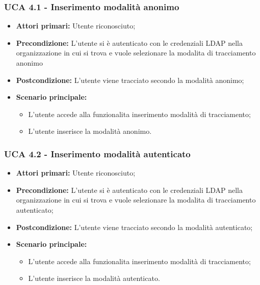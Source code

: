 \subsubsection{UCA 4.1 - Inserimento modalità anonimo}%
\begin{itemize}
\item \textbf{Attori primari:} Utente riconosciuto;
\item \textbf{Precondizione:} L'utente si è autenticato con le credenziali LDAP nella organizzazione in cui si trova e vuole selezionare la modalita di tracciamento anonimo
\item \textbf{Postcondizione:}  L'utente viene tracciato secondo la modalità anonimo;
\item \textbf{Scenario principale:}
	\begin{itemize}
	\item L'utente accede alla funzionalita inserimento modalità di tracciamento;
	\item L'utente inserisce la modalità anonimo.
\end{itemize}
\end{itemize}

\subsubsection{UCA 4.2 - Inserimento modalità autenticato}%
\begin{itemize}
	\item \textbf{Attori primari:} Utente riconosciuto;
	\item \textbf{Precondizione:} L'utente si è autenticato con le credenziali LDAP nella organizzazione in cui si trova e vuole selezionare la modalita di tracciamento autenticato;
	\item \textbf{Postcondizione:}  L'utente viene tracciato secondo la modalità autenticato;
	\item \textbf{Scenario principale:}
	\begin{itemize}
		\item L'utente accede alla funzionalita inserimento modalità di tracciamento;
		\item L'utente inserisce la modalità autenticato.
	\end{itemize}
\end{itemize}
